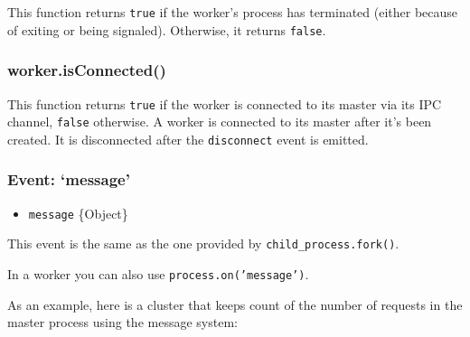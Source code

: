 This function returns \texttt{true} if the worker's process has
terminated (either because of exiting or being signaled). Otherwise, it
returns \texttt{false}.

\subsubsection{worker.isConnected()}\label{worker.isconnected}

This function returns \texttt{true} if the worker is connected to its
master via its IPC channel, \texttt{false} otherwise. A worker is
connected to its master after it's been created. It is disconnected
after the \texttt{disconnect} event is emitted.

\subsubsection{Event: `message'}\label{event-message}

\begin{itemize}
\itemsep1pt\parskip0pt
\item
  \texttt{message} \{Object\}
\end{itemize}

This event is the same as the one provided by
\texttt{child\_process.fork()}.

In a worker you can also use \texttt{process.on('message')}.

As an example, here is a cluster that keeps count of the number of
requests in the master process using the message system:

